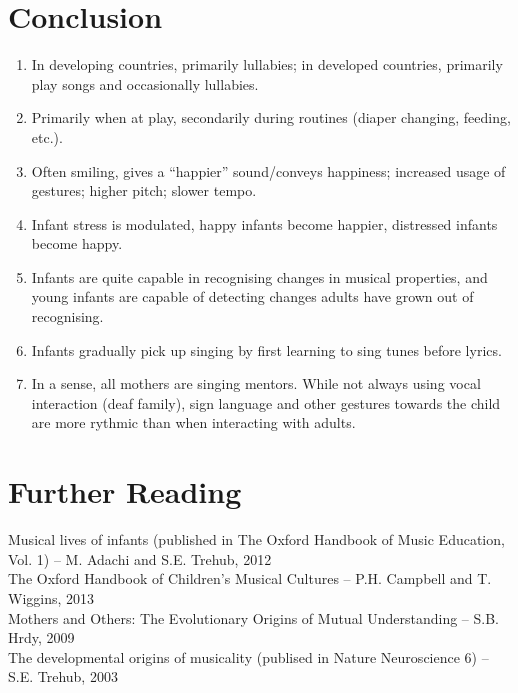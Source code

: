 \documentclass{beamer}
\begin{document}
\section{Conclusion}
\begin{frame}
	\begin{enumerate}
		\item In developing countries, primarily lullabies; in developed countries, primarily play songs and occasionally lullabies.
		\item Primarily when at play, secondarily during routines (diaper changing, feeding, etc.).
		\item Often smiling, gives a ``happier'' sound/conveys happiness; increased usage of gestures; higher pitch; slower tempo.
		\item Infant stress is modulated, happy infants become happier, distressed infants become happy.
	\end{enumerate}
\end{frame}
\begin{frame}
	\begin{enumerate}
		\setcounter{enumi}{4}
		\item Infants are quite capable in recognising changes in musical properties, and young infants are capable of detecting changes adults have grown out of recognising.
		\item Infants gradually pick up singing by first learning to sing tunes before lyrics.
		\item In a sense, all mothers are singing mentors. While not always using vocal interaction (deaf family), sign language and other gestures towards the child are more rythmic than when interacting with adults.
	\end{enumerate}
\end{frame}

\section{Further Reading}
\begin{frame}
	Musical lives of infants (published in The Oxford Handbook of Music Education, Vol. 1) -- M. Adachi and S.E. Trehub, 2012\\
	The Oxford Handbook of Children's Musical Cultures -- P.H. Campbell and T. Wiggins, 2013\\
	Mothers and Others: The Evolutionary Origins of Mutual Understanding -- S.B. Hrdy, 2009\\
	The developmental origins of musicality (publised in Nature Neuroscience 6) -- S.E. Trehub, 2003
\end{frame}
\end{document}
